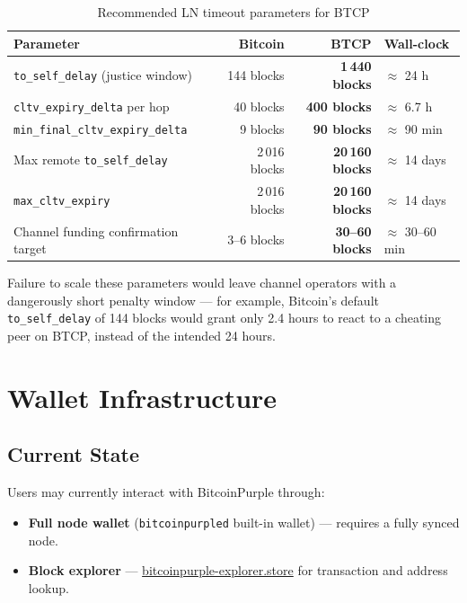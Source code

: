 \documentclass[12pt, a4paper]{article}
\begin{document}
\begin{table}[h!]
\centering
\caption{Recommended LN timeout parameters for BTCP}
\small
\begin{tabular}{@{}lrrl@{}}
\toprule
\textbf{Parameter} & \textbf{Bitcoin} & \textbf{BTCP} & \textbf{Wall-clock} \\
\midrule
\texttt{to\_self\_delay} (justice window)         & 144 blocks & \textbf{1\,440 blocks} & $\approx$ 24 h \\
\texttt{cltv\_expiry\_delta} per hop              &  40 blocks & \textbf{400 blocks}   & $\approx$ 6.7 h \\
\texttt{min\_final\_cltv\_expiry\_delta}          &   9 blocks & \textbf{90 blocks}    & $\approx$ 90 min \\
Max remote \texttt{to\_self\_delay}               & 2\,016 blocks & \textbf{20\,160 blocks} & $\approx$ 14 days \\
\texttt{max\_cltv\_expiry}                        & 2\,016 blocks & \textbf{20\,160 blocks} & $\approx$ 14 days \\
Channel funding confirmation target               & 3–6 blocks & \textbf{30–60 blocks} & $\approx$ 30–60 min \\
\bottomrule
\end{tabular}
\end{table}

Failure to scale these parameters would leave channel operators with a
dangerously short penalty window — for example, Bitcoin's default
\texttt{to\_self\_delay} of 144 blocks would grant only 2.4 hours to react
to a cheating peer on BTCP, instead of the intended 24 hours.

\newpage
\section{Wallet Infrastructure}

\subsection{Current State}

Users may currently interact with BitcoinPurple through:

\begin{itemize}[noitemsep]
  \item \textbf{Full node wallet} (\texttt{bitcoinpurpled} built-in wallet) —
        requires a fully synced node.
  \item \textbf{Block explorer} —
        \href{https://bitcoinpurple-explorer.store/}{bitcoinpurple-explorer.store}
        for transaction and address lookup.
\end{itemize}
\end{document}
